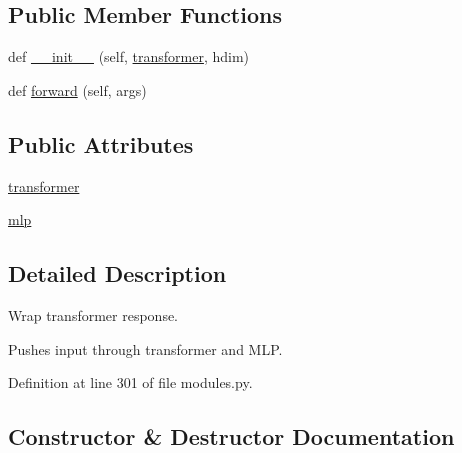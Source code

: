 \subsection*{Public Member Functions}
\begin{DoxyCompactItemize}
\item 
def \hyperlink{classparlai_1_1agents_1_1transformer_1_1modules_1_1TransformerResponseWrapper_ab078bf40bb275ebd56b4e205923ab827}{\+\_\+\+\_\+init\+\_\+\+\_\+} (self, \hyperlink{classparlai_1_1agents_1_1transformer_1_1modules_1_1TransformerResponseWrapper_ae757bd573993a3ca4a31e9d65b1a7e9a}{transformer}, hdim)
\item 
def \hyperlink{classparlai_1_1agents_1_1transformer_1_1modules_1_1TransformerResponseWrapper_ad716cb3a5874f46b1aa4beb45ba1b944}{forward} (self, args)
\end{DoxyCompactItemize}
\subsection*{Public Attributes}
\begin{DoxyCompactItemize}
\item 
\hyperlink{classparlai_1_1agents_1_1transformer_1_1modules_1_1TransformerResponseWrapper_ae757bd573993a3ca4a31e9d65b1a7e9a}{transformer}
\item 
\hyperlink{classparlai_1_1agents_1_1transformer_1_1modules_1_1TransformerResponseWrapper_a11ccb5cd5d1b5236b08c904bdeb9e041}{mlp}
\end{DoxyCompactItemize}


\subsection{Detailed Description}
\begin{DoxyVerb}Wrap transformer response.

Pushes input through transformer and MLP.
\end{DoxyVerb}
 

Definition at line 301 of file modules.\+py.



\subsection{Constructor \& Destructor Documentation}
\mbox{\label{classparlai_1_1agents_1_1transformer_1_1modules_1_1TransformerResponseWrapper_ab078bf40bb275ebd56b4e205923ab827}} 
